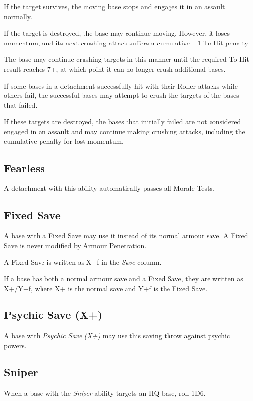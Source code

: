 If the target survives, the moving base stops and engages it in an assault normally.

If the target is destroyed, the base may continue moving. However, it loses momentum, and its next crushing attack suffers a cumulative $-1$ To-Hit penalty.

The base may continue crushing targets in this manner until the required To-Hit result reaches 7+, at which point it can no longer crush additional bases.

If some bases in a detachment successfully hit with their Roller attacks while others fail, the successful bases may attempt to crush the targets of the bases that failed.

If these targets are destroyed, the bases that initially failed are not considered engaged in an assault and may continue making crushing attacks, including the cumulative penalty for lost momentum.

\subsection{Fearless}

A detachment with this ability automatically passes all Morale Tests.

\subsection{Fixed Save}

A base with a Fixed Save may use it instead of its normal armour save. A Fixed Save is never modified by Armour Penetration.

A Fixed Save is written as X+f in the \textit{Save} column.

If a base has both a normal armour save and a Fixed Save, they are written as X+/Y+f, where X+ is the normal save and Y+f is the Fixed Save.

\subsection{Psychic Save (X+)}

A base with \textit{Psychic Save (X+)} may use this saving throw against psychic powers.

\subsection{Sniper}

When a base with the \textit{Sniper} ability targets an HQ base, roll 1D6.

